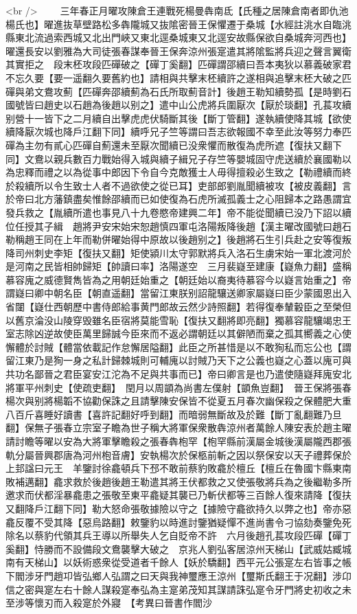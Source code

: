 <br />
　　三年春正月曜攻陳倉王連戰死楊曼犇南氐【氏種之居陳倉南者即仇池楊氏也】曜進抜草壁路松多犇隴城又抜隂密晉王保懼遷于桑城【水經註洮水自臨洮縣東北流過索西城又北出門峽又東北逕桑城東又北逕安故縣保欲自桑城奔河西也】曜還長安以劉雅為大司徒張春謀奉晉王保奔涼州張寔遣其將隂監將兵迎之聲言翼衛其實拒之　段末柸攻段匹磾破之【磾丁奚翻】匹磾謂邵續曰吾本夷狄以慕義破家君不忘久要【要一遥翻久要舊約也】請相與共擊末柸續許之遂相與追擊末柸大破之匹磾與弟文鴦攻薊【匹磾奔邵續薊為石氏所取薊音計】後趙王勒知續勢孤【是時劉石國號皆曰趙史以石趙為後趙以别之】遣中山公虎將兵圍厭次【厭於琰翻】孔萇攻續别營十一皆下之二月續自出擊虎虎伏騎斷其後【斷丁管翻】遂執續使降其城【欲使續降厭次城也降戶江翻下同】續呼兄子竺等謂曰吾志欲報國不幸至此汝等努力奉匹磾為主勿有貳心匹磾自薊還未至厭次聞續已没衆懼而散復為虎所遮【復扶又翻下同】文鴦以親兵數百力戰始得入城與續子緝兄子存竺等嬰城固守虎送續於襄國勒以為忠釋而禮之以為從事中郎因下令自今克敵獲士人毋得擅殺必生致之【勒禮續而終於殺續所以令生致士人者不過欲使之從已耳】吏部郎劉胤聞續被攻【被皮義翻】言於帝曰北方藩鎮盡矣惟餘邵續而已如使復為石虎所滅孤義士之心阻歸本之路愚謂宜發兵救之【胤續所遣也事見八十九卷愍帝建興二年】帝不能從聞續已没乃下詔以續位任授其子緝　趙將尹安宋始宋恕趙慎四軍屯洛陽叛降後趙【漢主曜改國號曰趙石勒稱趙王同在上年而勒併曜始得中原故以後趙别之】後趙將石生引兵赴之安等復叛降司州刺史李矩【復扶又翻】矩使潁川太守郭默將兵入洛石生虜宋始一軍北渡河於是河南之民皆相帥歸矩【帥讀曰率】洛陽遂空　三月裴嶷至建康【嶷魚力翻】盛稱慕容廆之威德賢雋皆為之用朝廷始重之【朝廷始以裔夷待慕容今以嶷言始重之】帝謂嶷曰卿中朝名臣【朝直遥翻】當留江東朕别詔龍驤送卿家屬嶷曰臣少蒙國恩出入省闥【嶷仕西朝歷中書侍郎給事黄門郎故云然少詩照翻】若得復奉輦轂臣之至榮但以舊京淪没山陵穿毁雖名臣宿將莫能雪恥【復扶又翻將即亮翻】獨慕容龍驤竭忠王室志除凶逆故使臣萬里歸誠今臣來而不返必謂朝廷以其僻陋而棄之孤其嚮義之心使懈體於討賊【體當依載記作怠懈居隘翻】此臣之所甚惜是以不敢狥私而忘公也【謂留江東乃是狥一身之私計歸棘城則可輔廆以討賊乃天下之公義也嶷之心蓋以廆可與共功名鄙晉之君臣宴安江沱為不足與共事而已】帝曰卿言是也乃遣使隨嶷拜廆安北將軍平州刺史【使疏吏翻】　閏月以周顗為尚書左僕射【顗魚豈翻】　晉王保將張春楊次與别將楊韜不協勸保誅之且請擊陳安保皆不從夏五月春次幽保殺之保體肥大重八百斤喜睡好讀書【喜許記翻好呼到翻】而暗弱無斷故及於難【斷丁亂翻難乃旦翻】保無子張春立宗室子瞻為世子稱大將軍保衆散犇涼州者萬餘人陳安表於趙主曜請討瞻等曜以安為大將軍擊瞻殺之張春犇枹罕【枹罕縣前漢屬金城後漢屬隴西郡張軌分屬晉興郡唐為河州枹音膚】安執楊次於保柩前斬之因以祭保安以天子禮葬保於上邽諡曰元王　羊鑒討徐龕頓兵下邳不敢前蔡豹敗龕於檀丘【檀丘在魯國卞縣東南敗補邁翻】龕求救於後趙後趙王勒遣其將王伏都救之又使張敬將兵為之後繼勒多所邀求而伏都淫暴龕患之張敬至東平龕疑其襲已乃斬伏都等三百餘人復來請降【復扶又翻降戶江翻下同】勒大怒命張敬據險以守之【據險守龕欲持久以弊之也】帝亦惡龕反覆不受其降【惡烏路翻】敕鑒豹以時進討鑒猶疑憚不進尚書令刁協劾奏鑒免死除名以蔡豹代領其兵王導以所舉失人乞自貶帝不許　六月後趙孔萇攻段匹磾【磾丁奚翻】恃勝而不設備段文鴦襲擊大破之　京兆人劉弘客居涼州天梯山【武威姑臧城南有天梯山】以妖術惑衆從受道者千餘人【妖於驕翻】西平元公張寔左右皆事之帳下閻涉牙門趙卭皆弘鄉人弘謂之曰天與我神璽應王涼州【璽斯氏翻王于况翻】涉卬信之密與寔左右十餘人謀殺寔奉弘為主寔弟茂知其謀請誅弘寔令牙門將史初收之未至涉等懷刃而入殺寔於外寢　【考異曰晉書作閻沙